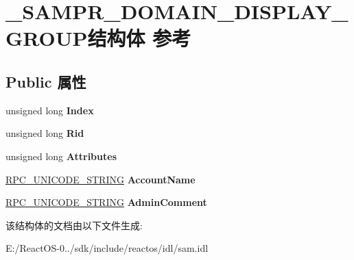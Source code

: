 \hypertarget{struct___s_a_m_p_r___d_o_m_a_i_n___d_i_s_p_l_a_y___g_r_o_u_p}{}\section{\+\_\+\+S\+A\+M\+P\+R\+\_\+\+D\+O\+M\+A\+I\+N\+\_\+\+D\+I\+S\+P\+L\+A\+Y\+\_\+\+G\+R\+O\+U\+P结构体 参考}
\label{struct___s_a_m_p_r___d_o_m_a_i_n___d_i_s_p_l_a_y___g_r_o_u_p}
\subsection*{Public 属性}
\begin{DoxyCompactItemize}
\item 
\mbox{\label{struct___s_a_m_p_r___d_o_m_a_i_n___d_i_s_p_l_a_y___g_r_o_u_p_a2321296efbe78314ef594ce055101bb4}} 
unsigned long {\bfseries Index}
\item 
\mbox{\label{struct___s_a_m_p_r___d_o_m_a_i_n___d_i_s_p_l_a_y___g_r_o_u_p_aca4d0a5cc4558922748374ef5b02809b}} 
unsigned long {\bfseries Rid}
\item 
\mbox{\label{struct___s_a_m_p_r___d_o_m_a_i_n___d_i_s_p_l_a_y___g_r_o_u_p_a65bdc9084d5e58fe6503a1f488285866}} 
unsigned long {\bfseries Attributes}
\item 
\mbox{\label{struct___s_a_m_p_r___d_o_m_a_i_n___d_i_s_p_l_a_y___g_r_o_u_p_a60cbb10c005bb77f9dbc40d986839421}} 
\hyperlink{struct___r_p_c___u_n_i_c_o_d_e___s_t_r_i_n_g}{R\+P\+C\+\_\+\+U\+N\+I\+C\+O\+D\+E\+\_\+\+S\+T\+R\+I\+NG} {\bfseries Account\+Name}
\item 
\mbox{\label{struct___s_a_m_p_r___d_o_m_a_i_n___d_i_s_p_l_a_y___g_r_o_u_p_a45318a986c957a33dfc5585b55232afc}} 
\hyperlink{struct___r_p_c___u_n_i_c_o_d_e___s_t_r_i_n_g}{R\+P\+C\+\_\+\+U\+N\+I\+C\+O\+D\+E\+\_\+\+S\+T\+R\+I\+NG} {\bfseries Admin\+Comment}
\end{DoxyCompactItemize}


该结构体的文档由以下文件生成\+:\begin{DoxyCompactItemize}
\item 
E\+:/\+React\+O\+S-\/0../sdk/include/reactos/idl/sam.\+idl\end{DoxyCompactItemize}
